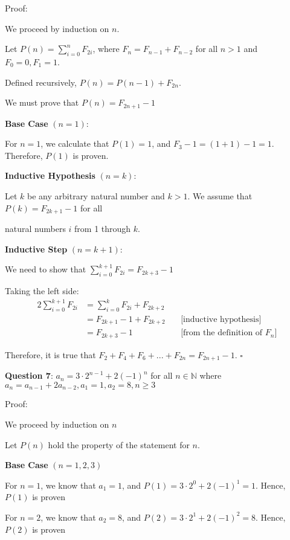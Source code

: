 \documentclass{article} %
\newcommand{\question}[2][]{\begin{flushleft}
        \textbf{Question #1}: #2

\end{flushleft}}
\begin{document}
    Proof:

    We proceed by induction on $n$.

    Let $P(n) = \sum_{i = 0}^{n} F_{2i}$, where $F_n = F_{n - 1} + F_{n - 2}$ for all $n > 1$ and $F_0 = 0, F_1 = 1$.

    Defined recursively, $P(n) = P(n - 1) + F_{2n}$.

    We must prove that $P(n) = F_{2n + 1} - 1$

    \textbf{Base Case} $(n = 1)$:

    For $n = 1$, we calculate that $P(1) = 1$, and $F_3 - 1 = (1 + 1) - 1 = 1$. Therefore, $P(1)$ is proven.

    \textbf{Inductive Hypothesis} $(n = k)$:

    Let $k$ be any arbitrary natural number and $k > 1$. We assume that $P(k) = F_{2k+1} - 1$ for all
    
    natural numbers $i$ from 1 through $k$.

    \textbf{Inductive Step} $(n = k + 1)$:

    We need to show that $\sum_{i = 0}^{k + 1} F_{2i} = F_{2k + 3} - 1$
    
    Taking the left side:
    \begin{alignat*}{2}
        \sum_{i = 0}^{k + 1} F_{2i} &= \sum_{i = 0}^{k} F_{2i} + F_{2k + 2}\\
        &= F_{2k+1} - 1 + F_{2k + 2}\ &&\text{[inductive hypothesis]}\\
        &= F_{2k + 3} - 1\ &&\text{[from the definition of $F_n$]}
    \end{alignat*}

    Therefore, it is true that $F_2 + F_4 + F_6 + ... + F_{2n} = F_{2n + 1} - 1$. $\square$

    \newpage

    \question[7]{$a_n = 3 \cdot 2^{n - 1} + 2(-1)^n$ for all $n \in \mathbb{N}$ where $a_n = a_{n - 1} + 2a_{n-2}, a_1 = 1, a_2 = 8, n \geq 3$}

    Proof:

    We proceed by induction on $n$

    Let $P(n)$ hold the property of the statement for $n$.

    \textbf{Base Case} $(n = 1, 2, 3)$

    For $n = 1$, we know that $a_1 = 1$, and $P(1) = 3 \cdot 2^0 + 2(-1)^1 = 1$. Hence, $P(1)$ is proven

    For $n = 2$, we know that $a_2 = 8$, and $P(2) = 3 \cdot 2^1 + 2(-1)^2 = 8$. Hence, $P(2)$ is proven
\end{document}
